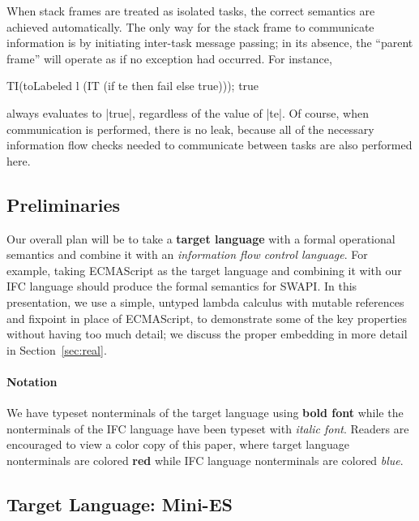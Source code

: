 When stack frames are treated as isolated tasks, the correct semantics
are achieved automatically.
%
The only way for the stack frame to communicate information is by
initiating inter-task message passing; in its absence, the ``parent
frame'' will operate as if no exception had occurred.
%
For instance, 
\begin{code}
TI(toLabeled l (IT (if te then fail else true))); true
\end{code}
always evaluates to |true|, regardless of the value of |te|.
%
Of course, when communication is performed, there is no leak,
because all of the necessary information flow checks needed to
communicate between tasks are also performed here.

\subsection{Preliminaries}

Our overall plan will be to take a \textbf{{\color{red} target
language}} with a formal operational semantics and combine it with an
\textit{{\color{blue} information flow control language}}.  For example,
taking ECMAScript as the target language and combining it with our IFC
language should produce the formal semantics for SWAPI.  In this
presentation, we use a simple, untyped lambda calculus with mutable
references and fixpoint in place of ECMAScript, to demonstrate some of the key
properties without having too much detail; we discuss the proper
embedding in more detail in Section~\ref{sec:real}.

\paragraph{Notation}
We have typeset nonterminals of the target language using \textbf{{\color{red}
bold font}} while the nonterminals of the IFC language have been typeset
with \textit{{\color{blue} italic font}}.  Readers are encouraged to view
a color copy of this paper, where target language nonterminals are colored \textbf{{\color{red} red}}
while IFC language nonterminals are colored \textit{{\color{blue} blue}}.

\subsection{Target Language: Mini-ES}

